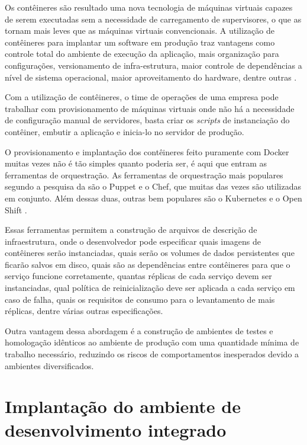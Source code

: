 \documentclass[
	12pt,				%
	openright,			%
	twoside,			%
	a4paper,			%
	english,			%
	french,				%
	spanish,			%
	brazil,				%
	]{abntex2}
\begin{document}
Os contêineres são resultado uma nova tecnologia de máquinas virtuais capazes de serem executadas sem a necessidade de carregamento de supervisores, o que as tornam mais leves que as máquinas virtuais convencionais. A utilização de contêineres para implantar um software em produção traz vantagens como controle total do ambiente de execução da aplicação, mais organização para configurações, versionamento de infra-estrutura, maior controle de dependências a nível de sistema operacional, maior aproveitamento do hardware, dentre outras \cite{JamesTurbull:DockerBook}.

Com a utilização de contêineres, o time de operações de uma empresa pode trabalhar com provisionamento de máquinas virtuais onde não há a necessidade de configuração manual de servidores, basta criar os \textit{scripts} de instanciação do contêiner, embutir a aplicação e inicia-lo no servidor de produção.

O provisionamento e implantação dos contêineres feito puramente com Docker muitas vezes não é tão simples quanto poderia ser, é aqui que entram as ferramentas de orquestração. As ferramentas de orquestração mais populares segundo a pesquisa da  são o Puppet e o Chef, que muitas das vezes são utilizadas em conjunto. Além dessas duas, outras bem populares são o 
Kubernetes \cite{Kubernetes:Orchestration} e o Open Shift \cite{OpenShift:Orchestration}.

Essas ferramentas permitem a construção de arquivos de descrição de infraestrutura, onde o desenvolvedor pode especificar quais imagens de contêineres serão instanciadas, quais serão os volumes de dados persistentes que ficarão salvos em disco, quais são as dependências entre contêineres para que o serviço funcione corretamente, quantas réplicas de cada serviço devem ser instanciadas, qual política de reinicialização deve ser aplicada a cada serviço em caso de falha, quais os requisitos de consumo para o levantamento de mais réplicas, dentre várias outras especificações.

Outra vantagem dessa abordagem é a construção de ambientes de testes e homologação idênticos ao ambiente de produção com uma quantidade mínima de trabalho necessário, reduzindo os riscos de comportamentos inesperados devido a ambientes diversificados.

\section{Implantação do ambiente de desenvolvimento integrado}
\end{document}
